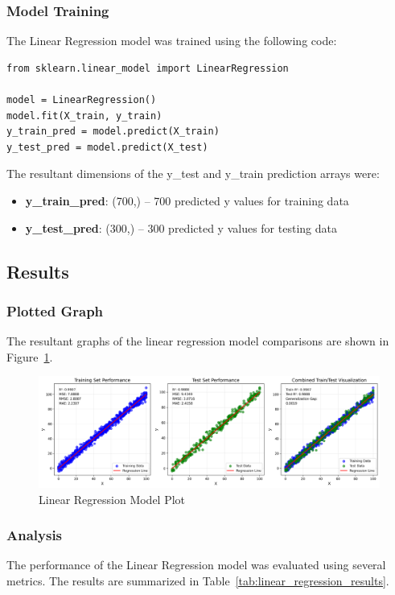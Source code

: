 \subsubsection{Model Training}
The Linear Regression model was trained using the following code:
\begin{verbatim}
from sklearn.linear_model import LinearRegression

model = LinearRegression()
model.fit(X_train, y_train)
y_train_pred = model.predict(X_train)
y_test_pred = model.predict(X_test)
\end{verbatim}

\noindent The resultant dimensions of the y\_test and y\_train prediction arrays were:
\begin{itemize}
    \item \textbf{y\_train\_pred}: (700,) -- 700 predicted y values for training data
    \item \textbf{y\_test\_pred}: (300,) -- 300 predicted y values for testing data
\end{itemize}

\newpage
\subsection{Results}
\subsubsection{Plotted Graph}

The resultant graphs of the linear regression model comparisons are shown in Figure~\ref{fig:linear_regression}.

\begin{figure}[htbp]
    \centering
    \includegraphics[width=\textwidth]{images/linear_regression_analysis_plot.png}
    \caption{Linear Regression Model Plot}\label{fig:linear_regression}
\end{figure}

\subsubsection{Analysis}
The performance of the Linear Regression model was evaluated using several metrics.
The results are summarized in Table~\ref{tab:linear_regression_results}.

